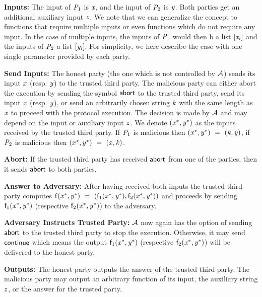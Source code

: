 \begin{asparaenum}
    \item \textbf{Inputs:} The input of $\mathit{P}_{1}$ is $\mathit{x}$, and the input of $\mathit{P}_{2}$ is $\mathit{y}$.
    Both parties get an additional auxiliary input $\mathit{z}$.
    We note that we can generalize the concept to functions that require multiple inputs or even functions which do not require any input.
    In the case of multiple inputs, the inputs of $\mathit{P}_{1}$ would then b a list $[\mathit{x}_i]$ and the inputs of $\mathit{P}_{2}$ a list $[\mathit{y}_i]$.
    For simplicity, we here describe the case with one single parameter provided by each party.
    \item \textbf{Send Inputs:} The honest party (the one which is not controlled by $\mathcal{A}$) sends its input $\mathit{x}$ (resp. $\mathit{y}$) to the trusted third party.
    The malicious party can either abort the execution by sending the symbol $\mathsf{abort}$ to the trusted third party, send its input $\mathit{x}$ (resp. $\mathit{y}$), or send an arbitrarily chosen string $\mathit{k}$ with the same length as $\mathit{x}$ to proceed with the protocol execution.
    The decision is made by $\mathcal{A}$ and may depend on the input or auxiliary input $\mathit{z}$.
    We denote $(\mathit{x}^*, \mathit{y}^*)$ as the inputs received by the trusted third party.
    If $\mathit{P}_{1}$ is malicious then $(x^*, y^*) ~=~ (\mathit{k}, \mathit{y})$, if $\mathit{P}_{2}$ is malicious then $(x^*, y^*) ~=~ (\mathit{x}, \mathit{k})$.
    \item \textbf{Abort:} If the trusted third party has received $\mathsf{abort}$ from one of the parties, then it sends $\mathsf{abort}$ to both parties.
    \item \textbf{Answer to Adversary:} After having received both inputs the trusted third party computes $\mathsf{f}(\mathit{x}^*, \mathit{y}^*) ~=~ (\mathsf{f}_1(\mathit{x}^*, \mathit{y}^*), \mathsf{f}_2(\mathit{x}^*, \mathit{y}^*))$ and proceeds by sending $\mathsf{f}_1(\mathit{x}^*, \mathit{y}^*)$ (respective $\mathsf{f}_2(\mathit{x}^*, \mathit{y}^*)$) to the adversary.
    \item \textbf{Adversary Instructs Trusted Party:} $\mathcal{A}$ now again has the option of sending $\mathsf{abort}$ to the trusted third party to stop the execution.
    Otherwise, it may send $\mathsf{continue}$ which means the output $\mathsf{f}_1(\mathit{x}^*, \mathit{y}^*)$ (respective $\mathsf{f}_2(\mathit{x}^*, \mathit{y}^*)$) will be delivered to the honest party.
    \item \textbf{Outputs:} The honest party outputs the answer of the trusted third party. The malicious party may output an arbitrary function of its input, the auxiliary string $\mathit{z}$, or the answer for the trusted party.
\end{asparaenum}

